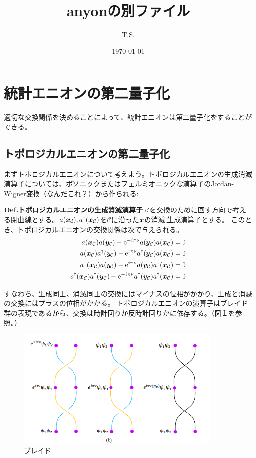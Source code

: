 \documentclass[a4paper,11pt]{jsarticle}
\begin{document}
\title{anyonの別ファイル}
\author{T.S.}
\date{\today}
\maketitle

\section{統計エニオンの第二量子化}
適切な交換関係を決めることによって、統計エニオンは第二量子化をすることができる。

\subsection{トポロジカルエニオンの第二量子化}
まずトポロジカルエニオンについて考えよう。トポロジカルエニオンの生成消滅演算子については、ボソニックまたはフェルミオニックな演算子のJordan-Wigner変換（なんだこれ？）から作られる:
\\

\begin{itembox}[l]{\textbf{Def.トポロジカルエニオンの生成消滅演算子 }}
$\mathcal{C}$を交換のために回す方向で考える閉曲線とする。$a(\vb*{x}_\mathcal{C}),a^{\dag}(\vb*{x}_\mathcal{C})$を$\mathcal{C}$に沿った$\vb*{x}$の消滅,生成演算子とする。
このとき、トポロジカルエニオンの交換関係は次で与えられる。
\begin{align}
a(\vb*{x}_\mathcal{C})a(\vb*{y}_\mathcal{C})-\mathrm{e}^{-i\pi\nu}a(\vb*{y}_\mathcal{C})a(\vb*{x}_\mathcal{C})=0\\
a(\vb*{x}_\mathcal{C})a^{\dag}(\vb*{y}_\mathcal{C})-\mathrm{e}^{i\pi\nu}a^{\dag}(\vb*{y}_\mathcal{C})a(\vb*{x}_\mathcal{C})=0\\
a^{\dag}(\vb*{x}_\mathcal{C})a(\vb*{y}_\mathcal{C})-\mathrm{e}^{i\pi\nu}a(\vb*{y}_\mathcal{C})a^{\dag}(\vb*{x}_\mathcal{C})=0\\
a^{\dag}(\vb*{x}_\mathcal{C})a^{\dag}(\vb*{y}_\mathcal{C})-\mathrm{e}^{-i\pi\nu}a^{\dag}(\vb*{y}_\mathcal{C})a^{\dag}(\vb*{x}_\mathcal{C})=0
\end{align}
\end{itembox}

すなわち、生成同士、消滅同士の交換にはマイナスの位相がかかり、生成と消滅の交換にはプラスの位相がかかる。
トポロジカルエニオンの演算子はブレイド群の表現であるから、交換は時計回りか反時計回りかに依存する。（図１を参照。）
\begin{figure}[htbp]
\begin{center}
\includegraphics[width=100mm]{braidwf.png}
\caption{ブレイド}
\end{center}
\end{figure}
\end{document}
